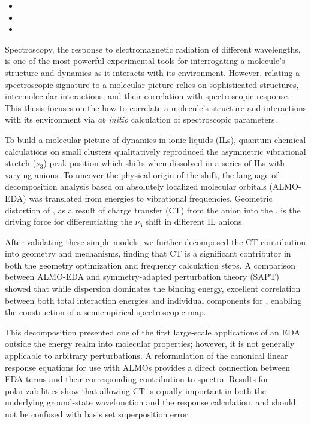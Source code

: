 \documentclass[%
  class = article,%
  crop = false,%
  float = true,%
  multi = true,%
  preview = false,%
]{standalone}
\newcommand{\arlidimer}{\ce{Ar\bond{....}Li+}}
\begin{document}
\begin{itemize}
\item {}
\item {}
\item {}
\end{itemize}

Spectroscopy, the   response to electromagnetic radiation of different wavelengths, is one of the most powerful experimental tools for interrogating a molecule's structure and dynamics as it interacts with its environment. However, relating a spectroscopic signature to a molecular picture relies on sophisticated   structures, intermolecular interactions, and their correlation with spectroscopic response. This thesis focuses on the how to correlate a molecule's structure and interactions with its environment via \textit{ab initio} calculation of spectroscopic parameters.

To build a molecular picture of  dynamics in ionic liquids (ILs), quantum chemical calculations on small clusters qualitatively reproduced the   asymmetric vibrational stretch (\(\nu_3\)) peak position which shifts when dissolved in a series of ILs with varying anions. To uncover the physical origin of the shift, the language of decomposition analysis based on absolutely localized molecular orbitals (ALMO-EDA) was translated from energies to vibrational frequencies. Geometric distortion of , as a result of charge transfer (CT) from the anion into the , is the driving force for differentiating the  \(\nu_3\) shift in different IL anions.

After validating these simple models, we further decomposed the CT contribution into geometry and   mechanisms, finding that CT is a significant contributor in both the geometry optimization and frequency calculation steps. A comparison between ALMO-EDA and symmetry-adapted perturbation theory (SAPT) showed that while dispersion dominates the binding energy, excellent correlation between both total interaction energies and individual components for  , enabling the construction of a semiempirical spectroscopic map.

This decomposition presented one of the first large-scale applications of an EDA outside the energy realm into molecular properties; however, it is not generally applicable to arbitrary perturbations. A reformulation of the canonical linear response equations for use with ALMOs provides a direct connection between EDA terms and their corresponding contribution to spectra. Results for \kdjerror{\arlidimer{}}  polarizabilities show that allowing CT is equally important in both the underlying ground-state wavefunction and the response calculation, and should not be confused with basis set superposition error.
\end{document}
